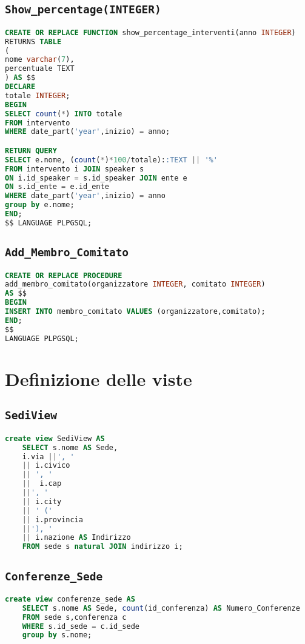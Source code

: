 \subsection{\texttt{Show\_percentage(INTEGER)}}
\begin{lstlisting}[language=SQL,style=mystyle]
CREATE OR REPLACE FUNCTION show_percentage_interventi(anno INTEGER)
RETURNS TABLE
(
nome varchar(7),
percentuale TEXT
) AS $$
DECLARE
totale INTEGER;
BEGIN
SELECT count(*) INTO totale
FROM intervento
WHERE date_part('year',inizio) = anno;

RETURN QUERY
SELECT e.nome, (count(*)*100/totale)::TEXT || '%'
FROM intervento i JOIN speaker s 
ON i.id_speaker = s.id_speaker JOIN ente e 
ON s.id_ente = e.id_ente
WHERE date_part('year',inizio) = anno
group by e.nome;
END;
$$ LANGUAGE PLPGSQL;
\end{lstlisting}
\subsection{\texttt{Add\_Membro\_Comitato}}
\begin{lstlisting}[language=SQL,style=mystyle]
CREATE OR REPLACE PROCEDURE 
add_membro_comitato(organizzatore INTEGER, comitato INTEGER)
AS $$
BEGIN
INSERT INTO membro_comitato VALUES (organizzatore,comitato);
END;
$$
LANGUAGE PLPGSQL;

\end{lstlisting}
\section{Definizione delle viste}
\subsection{\texttt{SediView}}
\begin{lstlisting}[language=SQL,style=mystyle]
	create view SediView AS 
	SELECT s.nome AS Sede, 
	i.via ||', ' 
	|| i.civico
	|| ', ' 
	||  i.cap 
	||', ' 
	|| i.city 
	|| ' (' 
	|| i.provincia 
	||'), '
	|| i.nazione AS Indirizzo
	FROM sede s natural JOIN indirizzo i;
\end{lstlisting}
\subsection{\texttt{Conferenze\_Sede}}
\begin{lstlisting}[language=SQL,style=mystyle]
	create view conferenze_sede AS
	SELECT s.nome AS Sede, count(id_conferenza) AS Numero_Conferenze
	FROM sede s,conferenza c
	WHERE s.id_sede = c.id_sede
	group by s.nome;
\end{lstlisting}
